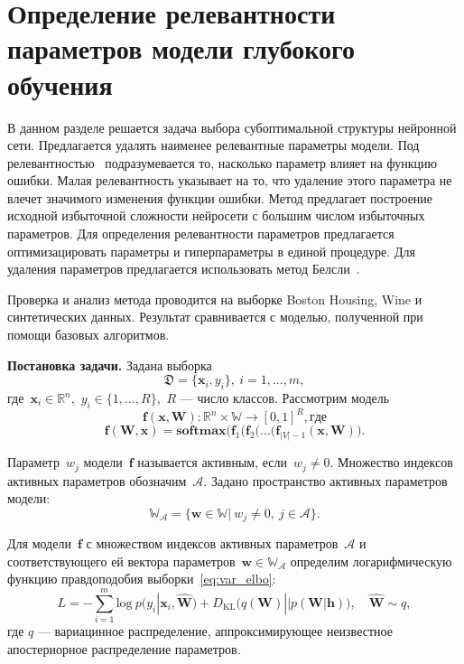 





























\section{Определение релевантности параметров модели глубокого обучения}
В данном разделе решается задача выбора субоптимальной структуры нейронной сети. Предлагается удалять наименее релевантные параметры модели. Под релевантностью~\cite{nips} подразумевается то, насколько параметр влияет на функцию ошибки. Малая релевантность указывает на то, что удаление этого параметра не влечет значимого изменения функции ошибки. Метод предлагает построение исходной избыточной сложности нейросети с большим числом избыточных параметров. Для определения релевантности параметров предлагается оптимизацировать параметры и гиперпараметры в единой процедуре. Для удаления параметров предлагается использовать метод Белсли~\cite{neychev}.

Проверка и анализ метода проводится на выборке Boston Housing, Wine и синтетических данных. Результат сравнивается с моделью, полученной при помощи базовых алгоритмов.

\textbf{Постановка задачи. } 
Задана выборка
$$\mathfrak{D} = \{\textbf{x}_i,y_i\},~ i =1,...,m,$$
где~$\textbf{x}_i \in \mathbb{R}^{n}$,~$y_i \in \{1, \dots, R\}$,~$R$ --- число классов.
Рассмотрим модель~$$\mathbf{f}(\mathbf{x}, \mathbf{W}): \mathbb{R}^n \times \mathbb{W} \to [0,1]^R, где$$
$$\mathbf{f}(\mathbf{W}, \mathbf{x}) = \textbf{softmax}\bigl( \mathbf{f}_1(\mathbf{f}_2(...(\mathbf{f}_{|V|-1}(\mathbf{x}, \mathbf{W})\bigr).$$

Параметр~$w_j$ модели~$\mathbf{f}$  называется активным, если~$w_j \not = 0$. Множество индексов активных параметров обозначим~$\mathcal{A}$.
Задано пространство активных параметров модели:
$$\mathbb{W}_{\mathcal{A}} = \{ \textbf{w} \in \mathbb{W}|~w_j\not=0,~j \in \mathcal{A}  \}.$$


Для модели~$\mathbf{f}$ с множеством индексов активных параметров~$\mathcal{A}$ и соответствующего ей вектора параметров~$\textbf{w} \in \mathbb{W_\mathcal{A}}$  определим логарифмическую функцию правдоподобия выборки~\eqref{eq:var_elbo}:
\begin{equation}
\label{eq:applied_elbo}
    L = -\sum_{i=1}^m \text{log}~p({y}_i|\mathbf{x}_i, \hat{\mathbf{W}}) + D_\text{KL}\bigl(q (\mathbf{W}) || p (\mathbf{W}|\mathbf{h})\bigr),\quad \hat{\mathbf{W}} \sim q,
\end{equation}
где $q$ --- вариацинное распределение, аппроксимирующее неизвестное апостериорное распределение параметров.

